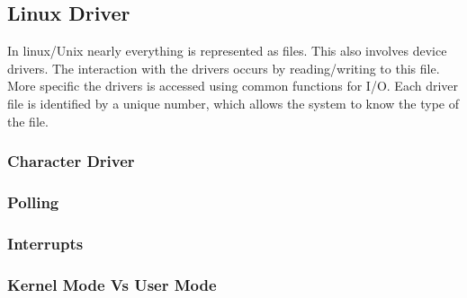 \subsection{Linux Driver}
In linux/Unix nearly everything is represented as files. This also involves device drivers. The interaction with the drivers occurs by reading/writing to this file. More specific the drivers is accessed  using common functions for I/O. Each driver file is identified by a unique number, which allows the system to know the type of the file. 









\subsubsection{Character Driver}


\subsubsection{Polling}

\subsubsection{Interrupts}

\subsubsection{Kernel Mode Vs User Mode}



